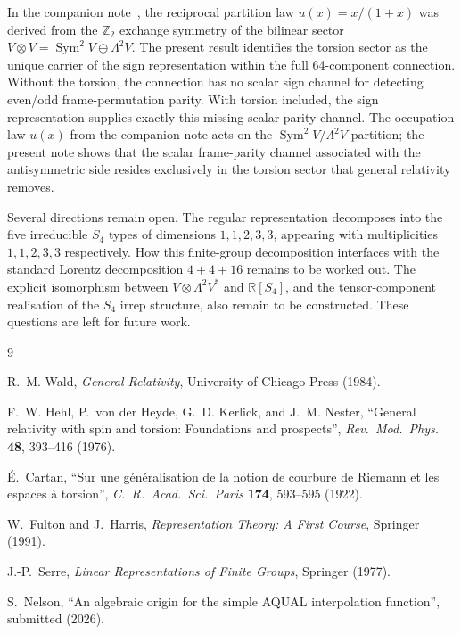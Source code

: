 \documentclass[11pt]{article}
\newcommand{\Sym}{\operatorname{Sym}}
\begin{document}
In the companion note~\cite{PhaseA}, the reciprocal partition law
$u(x)=x/(1+x)$ was derived from the $\mathbb Z_2$ exchange
symmetry of the bilinear sector $V\otimes V=\Sym^2V\oplus
\Lambda^2V$.  The present result identifies the torsion sector as
the unique carrier of the sign representation within the full
64-component connection.  Without the torsion, the connection has
no scalar sign channel for detecting even/odd frame-permutation
parity.  With torsion included, the sign representation supplies
exactly this missing scalar parity channel.
The occupation law $u(x)$ from the companion note acts on the
$\Sym^2V/\Lambda^2V$ partition; the present note shows that the
scalar frame-parity channel associated with the antisymmetric side
resides exclusively in the torsion sector that general relativity
removes.

Several directions remain open.  The regular representation
decomposes into the five irreducible $S_4$ types of dimensions
$1,1,2,3,3$, appearing with multiplicities $1,1,2,3,3$
respectively.  How this finite-group decomposition interfaces with
the standard Lorentz decomposition $4+4+16$ remains to be worked
out.  The explicit isomorphism between $V\otimes\Lambda^2V^*$ and
$\mathbb R[S_4]$, and the tensor-component realisation of the
$S_4$ irrep structure, also remain to be constructed.  These
questions are left for future work.


\begin{thebibliography}{9}

R.~M. Wald,
\emph{General Relativity},
University of Chicago Press (1984).

F.~W. Hehl, P.~von der Heyde, G.~D. Kerlick, and J.~M. Nester,
``General relativity with spin and torsion: Foundations and
prospects'',
\emph{Rev.\ Mod.\ Phys.} \textbf{48}, 393--416 (1976).

\'E.~Cartan,
``Sur une g\'en\'eralisation de la notion de courbure de Riemann
et les espaces \`a torsion'',
\emph{C.\ R.\ Acad.\ Sci.\ Paris} \textbf{174}, 593--595 (1922).

W.~Fulton and J.~Harris,
\emph{Representation Theory: A First Course},
Springer (1991).

J.-P.~Serre,
\emph{Linear Representations of Finite Groups},
Springer (1977).

S.~Nelson,
``An algebraic origin for the simple AQUAL interpolation
function'',
submitted (2026).

\end{thebibliography}
\end{document}
